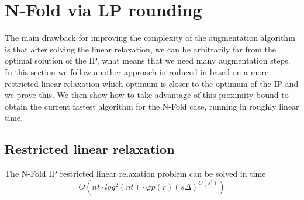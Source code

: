 \newpage
\section{N-Fold via LP rounding}  %

The main drawback for improving the complexity of the augmentation algorithm is that after solving the linear relaxation, we can be arbitrarily far from the optimal solution of the IP, what means that we need many augmentation steps. In this section we follow another approach introduced in \cite{EISENBRAND:2020} based on a more restricted linear relaxation which optimum is closer to the optimum of the IP and we prove this. We then show how to take advantage of this proximity bound to obtain the current fastest algorithm for the N-Fold case, running in roughly linear time.


\subsection{Restricted linear relaxation}
\begin{proposition}
    The N-Fold IP restricted linear relaxation problem can be solved in time
    \begin{equation*}
        O(nt \cdot log^2(nt) \cdot \varphi p(r) (s\Delta)^{O(s^2)})
    \end{equation*}
\end{proposition}

